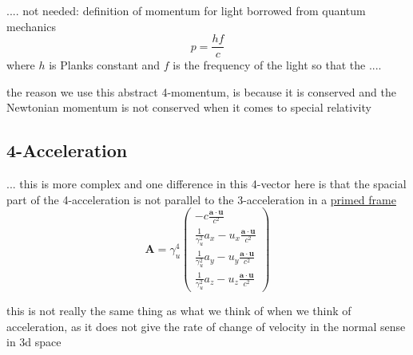 ....
not needed:
definition of momentum for light borrowed from quantum mechanics
\begin{equation}
    p = \frac{hf}{c}
\end{equation}
where $h$ is Planks constant and $f$ is the frequency of the light
so that the
....

the reason we use this abstract 4-momentum, is because it is conserved and the Newtonian momentum is not conserved when it comes to special relativity


\subsection{4-Acceleration}
... this is more complex and one difference in this 4-vector here is that the spacial part of the 4-acceleration is not parallel to the 3-acceleration in a \hyperlink{def-Primed-Frame}{primed frame} 
\begin{equation}
    \mathbf{A} = \gamma_u^4 \begin{pmatrix}
         -c\frac{\mathbf{a}\cdot\mathbf{u}}{c^2} \\ \frac{1}{\gamma_u^2} a_x - u_x \frac{\mathbf{a}\cdot\mathbf{u}}{c^2}\\ \frac{1}{\gamma_u^2} a_y - u_y \frac{\mathbf{a}\cdot\mathbf{u}}{c^2} \\ \frac{1}{\gamma_u^2} a_z - u_z \frac{\mathbf{a}\cdot\mathbf{u}}{c^2}
     \end{pmatrix}
\end{equation}

this is not really the same thing as what we think of when we think of acceleration, as it does not give the rate of change of velocity in the normal sense in 3d space

